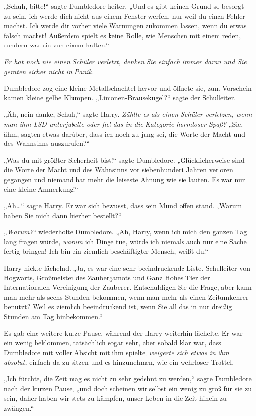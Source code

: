 {„Schuh, bitte!“ sagte Dumbledore heiter. „Und es gibt keinen Grund so besorgt zu sein, ich werde dich nicht aus einem Fenster werfen, nur weil du einen Fehler machst. Ich werde dir vorher viele Warnungen zukommen lassen, wenn du etwas falsch machst! Außerdem spielt es keine Rolle, wie Menschen mit einem reden, sondern was sie von einem halten.“

\emph{Er hat noch nie einen Schüler verletzt, denken Sie einfach immer daran und Sie geraten sicher nicht in Panik.}

Dumbledore zog eine kleine Metallschachtel hervor und öffnete sie, zum Vorschein kamen kleine gelbe Klumpen. „Limonen-Brausekugel?“ sagte der Schulleiter.

„Äh, nein danke, Schuh,“ sagte Harry. \emph{Zählte es als einen Schüler verletzen, wenn man ihm LSD unterjubelte oder fiel das in die Kategorie harmloser Spaß?} „Sie, ähm, sagten etwas darüber, dass ich noch zu jung sei, die Worte der Macht und des Wahnsinns auszurufen?“

„Was du mit größter Sicherheit bist!“ sagte Dumbledore. „Glücklicherweise sind die Worte der Macht und des Wahnsinns vor siebenhundert Jahren verloren gegangen und niemand hat mehr die leiseste Ahnung wie sie lauten. Es war nur eine kleine Anmerkung!“

„Ah…“ sagte Harry. Er war sich bewusst, dass sein Mund offen stand. „Warum haben Sie mich dann hierher bestellt?“

„\emph{Warum?}“ wiederholte Dumbledore. „Ah, Harry, wenn ich mich den ganzen Tag lang fragen würde, \emph{warum} ich Dinge tue, würde ich niemals auch nur eine Sache fertig bringen! Ich bin ein ziemlich beschäftigter Mensch, weißt du.“

Harry nickte lächelnd. „Ja, es war eine sehr beeindruckende Liste. Schulleiter von Hogwarts, Großmeister des Zaubergamots und Ganz Hohes Tier der Internationalen Vereinigung der Zauberer. Entschuldigen Sie die Frage, aber kann man mehr als sechs Stunden bekommen, wenn man mehr als einen Zeitumkehrer benutzt? Weil es ziemlich beeindruckend ist, wenn Sie all das in nur dreißig Stunden am Tag hinbekommen.“

Es gab eine weitere kurze Pause, während der Harry weiterhin lächelte. Er war ein wenig beklommen, tatsächlich sogar sehr, aber sobald klar war, dass Dumbledore mit voller Absicht mit ihm spielte, \emph{weigerte sich etwas in ihm absolut,} einfach da zu sitzen und es hinzunehmen, wie ein wehrloser Trottel.

„Ich fürchte, die Zeit mag es nicht zu sehr gedehnt zu werden,“ sagte Dumbledore nach der kurzen Pause, „und doch scheinen wir selbst ein wenig zu groß für sie zu sein, daher haben wir stets zu kämpfen, unser Leben in die Zeit hinein zu zwängen.“

}
